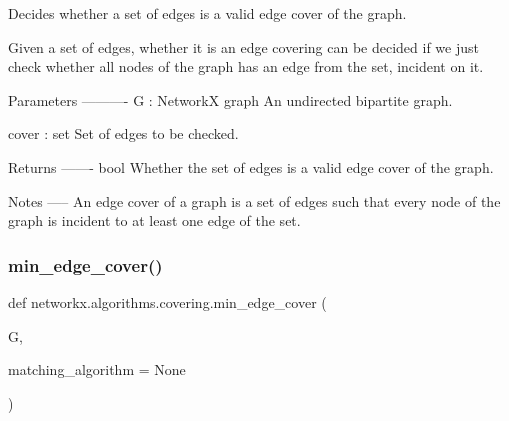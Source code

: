 \begin{DoxyVerb}Decides whether a set of edges is a valid edge cover of the graph.

Given a set of edges, whether it is an edge covering can
be decided if we just check whether all nodes of the graph
has an edge from the set, incident on it.

Parameters
----------
G : NetworkX graph
    An undirected bipartite graph.

cover : set
    Set of edges to be checked.

Returns
-------
bool
    Whether the set of edges is a valid edge cover of the graph.

Notes
-----
An edge cover of a graph is a set of edges such that every node of
the graph is incident to at least one edge of the set.
\end{DoxyVerb}
 \mbox{\label{namespacenetworkx_1_1algorithms_1_1covering_ab3764d89e742d671d83a959d57dd76b4}} 
\subsubsection{\texorpdfstring{min\+\_\+edge\+\_\+cover()}{min\_edge\_cover()}}
{\footnotesize\ttfamily def networkx.\+algorithms.\+covering.\+min\+\_\+edge\+\_\+cover (\begin{DoxyParamCaption}\item[{}]{G,  }\item[{}]{matching\+\_\+algorithm = {\ttfamily None} }\end{DoxyParamCaption})}

